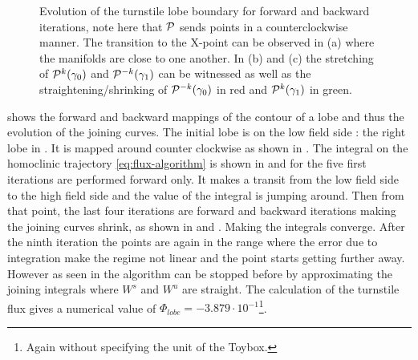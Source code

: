 \begin{figure}[H]
\begin{minipage}[c]{0.42\textwidth}
\begin{subfigure}[b]{0.95\textwidth}
        \end{subfigure}
    \end{minipage}%
    \caption{Evolution of the turnstile lobe boundary for forward and backward iterations, note here that $\mathcal{P}$ sends points in a counterclockwise manner. The transition to the X-point can be observed in (a) where the manifolds are close to one another. In (b) and (c) the stretching of $\mathcal{P}^k(\gamma_0)$ and $\mathcal{P}^{-k}(\gamma_1)$ can be witnessed as well as the straightening/shrinking of $\mathcal{P}^{-k}(\gamma_0)$ in red and $\mathcal{P}^{k}(\gamma_1)$ in green.}
    \label{fig:flux-poincare-conv}
\end{figure}

 shows the forward and backward mappings of the contour of a lobe and thus the evolution of the joining curves. The initial lobe is on the low field side : the right lobe in . It is mapped around counter clockwise as shown in . The integral on the homoclinic trajectory \eqref{eq:flux-algorithm} is shown in  and for the five first iterations are performed forward only. It makes a transit from the low field side to the high field side and the value of the integral is jumping around. Then from that point, the last four iterations are forward and backward iterations making the joining curves shrink, as shown in  and . Making the integrals converge. After the ninth iteration the points are again in the range where the error due to integration make the regime not linear and the point starts getting further away. However as seen in  the algorithm can be stopped before by approximating the joining integrals where $W^s$ and $W^u$ are straight. The calculation of the turnstile flux gives a numerical value of $\Phi_{lobe} = -3.879\cdot 10^{-1}$\footnote{Again without specifying the unit of the Toybox.}.

